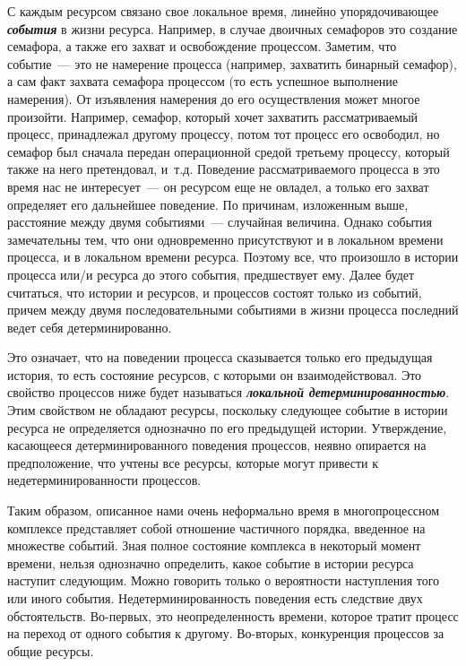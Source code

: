 \begin{multicols}{2}
{С каждым ресурсом связано свое локальное время, линейно
упорядочивающее {\bfseries\textit{события}} в жизни ресурса. Например, в случае
двоичных семафоров это создание семафора, а также его захват и освобождение
процессом. Заметим, что событие~--- это не намерение процесса (например,
захватить бинарный семафор), а сам факт захвата семафора процессом (то есть
успешное выполнение намерения). От изъявления намерения до его
осуществления может многое произойти. Например,
 семафор, который хочет
захватить рассматриваемый процесс, принадлежал другому процессу, потом
тот процесс его освободил, но семафор был сначала передан операционной
средой третьему процессу, который также на него претендовал, и~т.д.
Поведение рассматриваемого процесса в это время нас не интересует~--- он
ресурсом еще не овладел, а только его захват определяет его дальнейшее
поведение. По причинам,  изложенным выше, расстояние между двумя
событиями~--- случайная величина. Однако события замечательны тем, что
они одновременно присутствуют и в локальном времени процесса, и в
локальном времени ресурса. Поэтому все, что произошло в истории процесса
или/и ресурса до этого события, предшествует ему. Далее  будет считаться, что
истории и ресурсов, и процессов состоят только из событий, причем между
двумя последовательными событиями в жизни процесса последний ведет себя
детерминированно.
{ %

}

Это означает, что на  поведении процесса сказывается только его предыдущая 
история, то есть состояние ресурсов, с которыми он взаимодействовал. Это 
свойство процессов ниже будет называться {\bfseries\textit{локальной 
детерминированностью}}. Этим свойством не обладают ресурсы, поскольку следующее 
событие в истории ресурса не определяется однозначно по его предыду\-щей 
истории. Утверждение, ка\-са\-ющее\-ся детерминированного поведения процессов, 
неявно опирается на предположение,  что учтены все ресурсы, которые могут 
привести к недетерминированности процессов.

Таким образом, описанное нами очень неформально время в
многопроцессном комплексе представляет собой отношение частичного
порядка, введенное на множестве событий. Зная полное состояние комплекса в
некоторый момент времени,  нельзя однозначно определить, какое событие в
истории ресурса наступит следующим. Можно говорить только о вероятности
наступления того или иного события. Недетерминированность поведения есть
следствие двух обстоятельств. Во-первых, это неопределенность времени,
которое тратит процесс на переход от одного события к другому. Во-вторых,
конкуренция процессов за общие ресурсы.
{ %

}}
\end{multicols}
